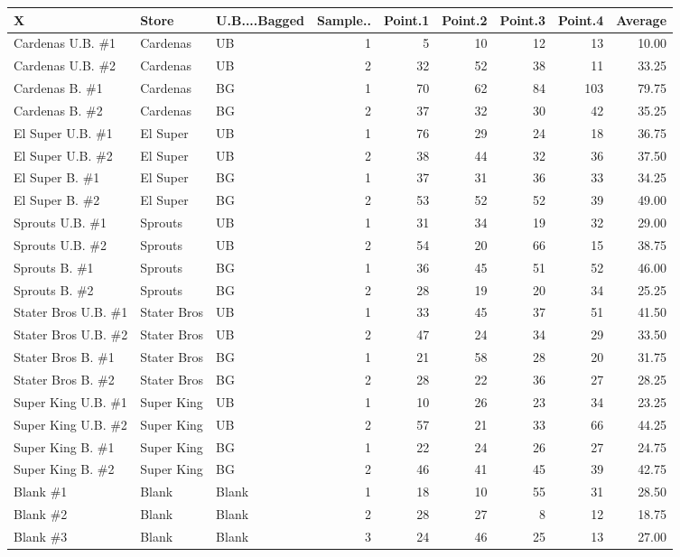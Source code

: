 \documentclass[]{article}
\begin{document}
\begin{table}[H]
\centering
\begin{tabular}{l|l|l|r|r|r|r|r|r}
\hline
X & Store & U.B....Bagged & Sample.. & Point.1 & Point.2 & Point.3 & Point.4 & Average\\
\hline
Cardenas U.B. \#1 & Cardenas & UB & 1 & 5 & 10 & 12 & 13 & 10.00\\
\hline
Cardenas U.B. \#2 & Cardenas & UB & 2 & 32 & 52 & 38 & 11 & 33.25\\
\hline
Cardenas B. \#1 & Cardenas & BG & 1 & 70 & 62 & 84 & 103 & 79.75\\
\hline
Cardenas B. \#2 & Cardenas & BG & 2 & 37 & 32 & 30 & 42 & 35.25\\
\hline
El Super U.B. \#1 & El Super & UB & 1 & 76 & 29 & 24 & 18 & 36.75\\
\hline
El Super U.B. \#2 & El Super & UB & 2 & 38 & 44 & 32 & 36 & 37.50\\
\hline
El Super B. \#1 & El Super & BG & 1 & 37 & 31 & 36 & 33 & 34.25\\
\hline
El Super B. \#2 & El Super & BG & 2 & 53 & 52 & 52 & 39 & 49.00\\
\hline
Sprouts U.B. \#1 & Sprouts & UB & 1 & 31 & 34 & 19 & 32 & 29.00\\
\hline
Sprouts U.B. \#2 & Sprouts & UB & 2 & 54 & 20 & 66 & 15 & 38.75\\
\hline
Sprouts B. \#1 & Sprouts & BG & 1 & 36 & 45 & 51 & 52 & 46.00\\
\hline
Sprouts B. \#2 & Sprouts & BG & 2 & 28 & 19 & 20 & 34 & 25.25\\
\hline
Stater Bros U.B. \#1 & Stater Bros & UB & 1 & 33 & 45 & 37 & 51 & 41.50\\
\hline
Stater Bros U.B. \#2 & Stater Bros & UB & 2 & 47 & 24 & 34 & 29 & 33.50\\
\hline
Stater Bros B. \#1 & Stater Bros & BG & 1 & 21 & 58 & 28 & 20 & 31.75\\
\hline
Stater Bros B. \#2 & Stater Bros & BG & 2 & 28 & 22 & 36 & 27 & 28.25\\
\hline
Super King U.B. \#1 & Super King & UB & 1 & 10 & 26 & 23 & 34 & 23.25\\
\hline
Super King U.B. \#2 & Super King & UB & 2 & 57 & 21 & 33 & 66 & 44.25\\
\hline
Super King B. \#1 & Super King & BG & 1 & 22 & 24 & 26 & 27 & 24.75\\
\hline
Super King B. \#2 & Super King & BG & 2 & 46 & 41 & 45 & 39 & 42.75\\
\hline
Blank \#1 & Blank & Blank & 1 & 18 & 10 & 55 & 31 & 28.50\\
\hline
Blank \#2 & Blank & Blank & 2 & 28 & 27 & 8 & 12 & 18.75\\
\hline
Blank \#3 & Blank & Blank & 3 & 24 & 46 & 25 & 13 & 27.00\\
\hline
\end{tabular}
\end{table}
\end{document}
